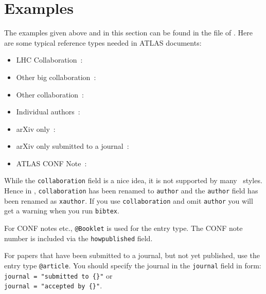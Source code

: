\documentclass[UKenglish, texlive=2016]{\ATLASLATEXPATH atlasdoc}
\begin{document}
\section{Examples}
\label{sec:example}

The examples given above and in this section can be found in the file 
of .
Here are some typical reference types needed in ATLAS documents:
\begin{itemize}
\item LHC Collaboration~\cite{lhcCollaboration:2012}:
  
\item Other big collaboration~\cite{tevatronCollaboration:1995}:
  
\item Other collaboration~\cite{otherCollaboration:2007}:
  
\item Individual authors~\cite{authors:2008}:
  
\item arXiv only~\cite{arxivOnly:2009}:
  
\item arXiv only submitted to a journal~\cite{arxivSub:2011}:
  
\item ATLAS CONF Note~\cite{ATLAS-CONF-2012-058-test}:
  
\end{itemize}

While the \texttt{collaboration} field is a nice idea, it is not supported by many \BibTeX\ styles.
Hence in , \texttt{collaboration} has been renamed to \texttt{author} and
the \texttt{author} field has been renamed as \texttt{xauthor}. If you use \texttt{collaboration} and omit
\texttt{author} you will get a warning when you run \texttt{bibtex}.

For CONF notes etc., \texttt{@Booklet} is used for the entry type.
The CONF note number is included via the \texttt{howpublished} field.

For papers that have been submitted to a journal, but not yet published, use the entry type \texttt{@article}.
You should specify the journal in the \texttt{journal} field in form:\\
\texttt{journal = "submitted to \{\}"} or\\
\texttt{journal = "accepted by \{\}"}.
\end{document}
